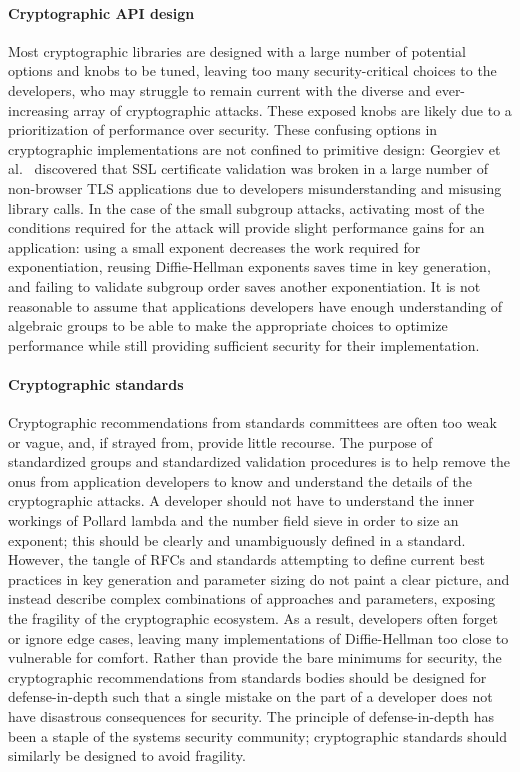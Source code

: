 \paragraph{Cryptographic API design}
Most cryptographic libraries are designed with a large number of potential
options and knobs to be tuned, leaving too many security-critical choices to
the developers, who may struggle to remain current with the diverse and
ever-increasing array of cryptographic attacks. These exposed knobs are likely
due to a prioritization of performance over security. These confusing options in
cryptographic implementations are not confined to primitive design: Georgiev et al.~\cite{most-dangerous-code-2012} discovered that SSL certificate validation was broken in a large number of non-browser TLS applications due to developers misunderstanding and misusing library calls.  In the case of the small
subgroup attacks, activating most of the conditions required for the attack
will provide slight performance gains for an application: using a small
exponent decreases the work required for exponentiation, reusing Diffie-Hellman
exponents saves time in key generation, and failing to validate subgroup order
saves another exponentiation. It is not reasonable to assume that applications
developers have enough understanding of algebraic groups to be able to make the
appropriate choices to optimize performance while still providing sufficient
security for their implementation.

\paragraph{Cryptographic standards}
Cryptographic recommendations from standards committees are often too weak or
vague, and, if strayed from, provide little recourse. The purpose of
standardized groups and standardized validation procedures is to help remove
the onus from application developers to know and understand the details of the
cryptographic attacks. A developer should not have to understand the inner
workings of Pollard lambda and the number field sieve in order to size an
exponent; this should be clearly and unambiguously defined in a standard.
However, the tangle of RFCs and standards attempting to define current best practices
in key generation and parameter sizing do not paint a clear picture, and instead 
describe complex combinations of approaches and
parameters, exposing the fragility of the cryptographic ecosystem. As a result,
developers often forget or ignore edge cases, leaving many implementations of
Diffie-Hellman too close to vulnerable for comfort. Rather than provide the
bare minimums for security, the cryptographic recommendations from standards
bodies should be designed for defense-in-depth such that a single mistake on the
part of a developer does not have disastrous consequences for security.  The
principle of defense-in-depth has been a staple of the systems security
community; cryptographic standards should similarly be designed to avoid
fragility.

